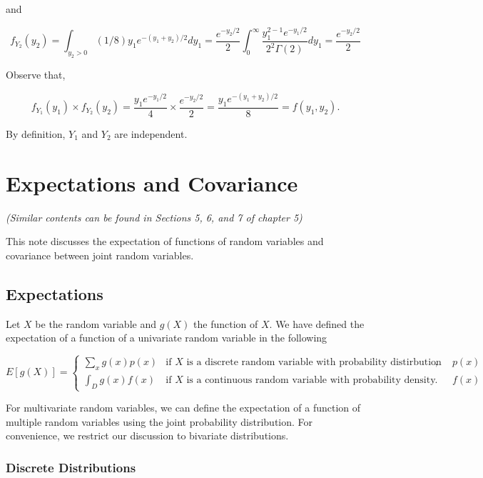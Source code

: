 \documentclass[
]{book}
\begin{document}
and

\[
f_{Y_2}(y_2) = \int_{y_2>0}  (1/8)y_1e^{-(y_1+y_2)/2} dy_1 = \frac{e^{-y_2/2}}{2}\int_0^\infty \frac{y_1^{2-1}e^{-y_1/2}}{2^2\Gamma(2)}dy_1=\frac{e^{-y_2/2}}{2}
\]

Observe that,

\[
f_{Y_1}(y_1) \times f_{Y_2}(y_2) = \frac{y_1e^{-y_1/2}}{4} \times \frac{e^{-y_2/2}}{2} = \frac{y_1e^{-(y_1+y_2)/2}}{8}=f(y_1, y_2).
\]

By definition, \(Y_1\) and \(Y_2\) are independent.

\hfill\break

\hypertarget{expectations-and-covariance}{%
\chapter{Expectations and Covariance}\label{expectations-and-covariance}}

\emph{(Similar contents can be found in Sections 5, 6, and 7 of chapter 5)}

This note discusses the expectation of functions of random variables and covariance between joint random variables.

\hfill\break

\hypertarget{expectations}{%
\section{Expectations}\label{expectations}}

Let \(X\) be the random variable and \(g(X)\) the function of \(X\). We have defined the expectation of a function of a univariate random variable in the following

\[
\displaystyle E[g(X)] = \begin{cases} 
 \sum_{x} g(x)p(x) & \text{if $X$ is a discrete random variable with probability distirbution function $p(x)$}, \\  
 \int_D g(x) f(x) & \text{if $X$ is a continuous random variable with probability density function $f(x)$}.
 \end{cases}
\]

For multivariate random variables, we can define the expectation of a function of multiple random variables using the joint probability distribution. For convenience, we restrict our discussion to bivariate distributions.

\hypertarget{discrete-distributions}{%
\subsection{Discrete Distributions}\label{discrete-distributions}}
\end{document}

